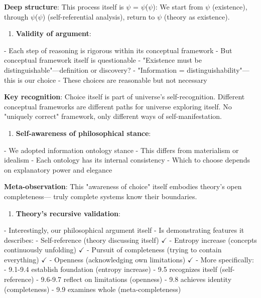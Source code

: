    \textbf{Deep structure}: This process itself is $\psi$ = $\psi$($\psi$):
   We start from $\psi$ (existence),
   through $\psi$($\psi$) (self-referential analysis),
   return to $\psi$ (theory as existence).

\begin{enumerate}
\item \textbf{Validity of argument}:
\end{enumerate}
   - Each step of reasoning is rigorous within its conceptual framework
   - But conceptual framework itself is questionable
   - "Existence must be distinguishable"---definition or discovery?
   - "Information = distinguishability"---this is our choice
   - These choices are reasonable but not necessary
   
   \textbf{Key recognition}: Choice itself is part of universe's self-recognition.
   Different conceptual frameworks are different paths for universe exploring itself.
   No "uniquely correct" framework, only different ways of self-manifestation.

\begin{enumerate}
\item \textbf{Self-awareness of philosophical stance}:
\end{enumerate}
   - We adopted information ontology stance
   - This differs from materialism or idealism
   - Each ontology has its internal consistency
   - Which to choose depends on explanatory power and elegance
   
   \textbf{Meta-observation}: This "awareness of choice" itself
   embodies theory's open completeness---
   truly complete systems know their boundaries.

\begin{enumerate}
\item \textbf{Theory's recursive validation}:
\end{enumerate}
   - Interestingly, our philosophical argument itself
   - Is demonstrating features it describes:
     - Self-reference (theory discussing itself) $\checkmark$
     - Entropy increase (concepts continuously unfolding) $\checkmark$
     - Pursuit of completeness (trying to contain everything) $\checkmark$
     - Openness (acknowledging own limitations) $\checkmark$
   - More specifically:
     - 9.1-9.4 establish foundation (entropy increase)
     - 9.5 recognizes itself (self-reference)
     - 9.6-9.7 reflect on limitations (openness)
     - 9.8 achieves identity (completeness)
     - 9.9 examines whole (meta-completeness)
   

